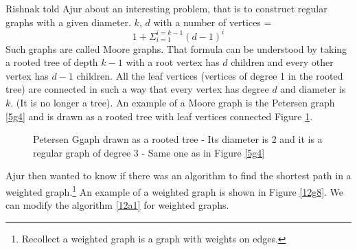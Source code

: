 Rishnak told Ajur about an interesting problem, that is to construct regular graphs with a given diameter. $k$, $d$ with a number of vertices = $$1+\Sigma_{i=1}^{i=k-1} (d-1)^i$$  Such graphs are called Moore graphs. That formula can be understood by taking a rooted tree of depth $k-1$ with a root vertex has $d$ children and every other vertex has $d-1$ children. All the leaf vertices (vertices of degree 1 in the rooted tree) are connected in such a way that every vertex has degree $d$ and diameter is $k$. (It is no longer a tree). An example of a Moore graph is the Petersen graph \ref{5g4} and is drawn as a rooted tree with leaf vertices connected Figure \ref{12g7}.
\begin{figure}
\caption{ Petersen Ggaph drawn as a rooted tree - Its diameter is 2 and it is a regular graph of degree 3 - Same one as in Figure  \ref{5g4}}\label{12g7}
\end{figure}



Ajur then wanted to know if there was an algorithm to find the shortest path in a weighted graph.\footnote{Recollect a weighted graph is a graph with weights on edges.} An example of a weighted graph is shown in Figure \ref{12g8}.
We can modify the algorithm \ref{12a1} for weighted graphs.

